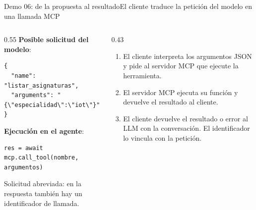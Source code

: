 \begin{frame}[fragile]{Demo 06: de la propuesta al resultado}{El cliente traduce la petición del modelo en una llamada MCP}
	\begin{columns}[T]
		\begin{column}{0.55\textwidth}
			{\footnotesize\textbf{Posible solicitud del modelo}:}
			\begin{lstlisting}[language={}]
{
  "name": "listar_asignaturas",
  "arguments": "{\"especialidad\":\"iot\"}"
}
\end{lstlisting}
			{\footnotesize\textbf{Ejecución en el agente}:}
			\begin{lstlisting}
res = await mcp.call_tool(nombre, argumentos)
\end{lstlisting}
			{\scriptsize Solicitud abreviada: en la respuesta también hay un identificador de llamada.}
		\end{column}
		\begin{column}{0.43\textwidth}
			\footnotesize
			\begin{enumerate}
				\setlength{\itemsep}{1pt}
				\item El cliente interpreta los argumentos JSON y pide al servidor MCP que ejecute la herramienta.
				\item El servidor MCP ejecuta su función y devuelve el resultado al cliente.
				\item El cliente devuelve el resultado o error al LLM con la conversación. El identificador lo vincula con la petición.
			\end{enumerate}
		\end{column}
	\end{columns}
\end{frame}

